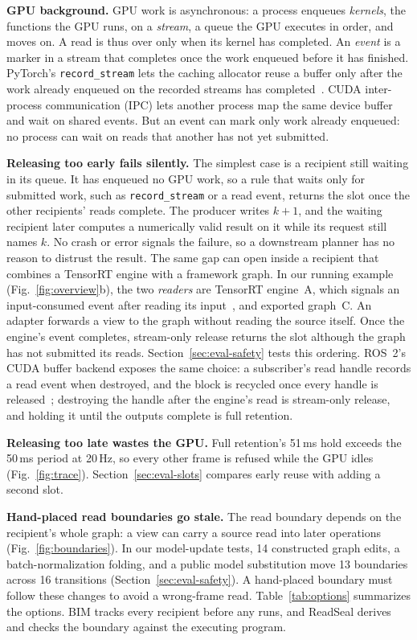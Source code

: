 \documentclass[conference]{IEEEtran}
\newcommand{\code}[1]{\texttt{#1}}
\newcommand{\ms}{\,ms}
\newcommand{\Hz}{\,Hz}
\begin{document}
\textbf{GPU background.} GPU work is asynchronous: a process enqueues \emph{kernels}, the functions the GPU runs, on a \emph{stream}, a queue the GPU executes in order, and moves on. A read is thus over only when its kernel has completed. An \emph{event} is a marker in a stream that completes once the work enqueued before it has finished. PyTorch's \code{record\_stream} lets the caching allocator reuse a buffer only after the work already enqueued on the recorded streams has completed~\cite{recordstream}. CUDA inter-process communication (IPC) lets another process map the same device buffer and wait on shared events. But an event can mark only work already enqueued: no process can wait on reads that another has not yet submitted.

\textbf{Releasing too early fails silently.} The simplest case is a recipient still waiting in its queue. It has enqueued no GPU work, so a rule that waits only for submitted work, such as \code{record\_stream} or a read event, returns the slot once the other recipients' reads complete. The producer writes $k{+}1$, and the waiting recipient later computes a numerically valid result on it while its request still names $k$. No crash or error signals the failure, so a downstream planner has no reason to distrust the result. The same gap can open inside a recipient that combines a TensorRT engine with a framework graph. In our running example (Fig.~\ref{fig:overview}b), the two \emph{readers} are TensorRT engine~A, which signals an input-consumed event after reading its input~\cite{tensorrt}, and exported graph~C. An adapter forwards a view to the graph without reading the source itself. Once the engine's event completes, stream-only release returns the slot although the graph has not submitted its reads. Section~\ref{sec:eval-safety} tests this ordering. ROS~2's CUDA buffer backend exposes the same choice: a subscriber's read handle records a read event when destroyed, and the block is recycled once every handle is released~\cite{cudabackend}; destroying the handle after the engine's read is stream-only release, and holding it until the outputs complete is full retention.

\textbf{Releasing too late wastes the GPU.} Full retention's 51\ms{} hold exceeds the 50\ms{} period at 20\Hz, so every other frame is refused while the GPU idles (Fig.~\ref{fig:trace}). Section~\ref{sec:eval-slots} compares early reuse with adding a second slot.

\textbf{Hand-placed read boundaries go stale.} The read boundary depends on the recipient's whole graph: a view can carry a source read into later operations (Fig.~\ref{fig:boundaries}). In our model-update tests, 14 constructed graph edits, a batch-normalization folding, and a public model substitution move 13 boundaries across 16 transitions (Section~\ref{sec:eval-safety}). A hand-placed boundary must follow these changes to avoid a wrong-frame read. Table~\ref{tab:options} summarizes the options. BIM tracks every recipient before any runs, and ReadSeal derives and checks the boundary against the executing program.
\end{document}
